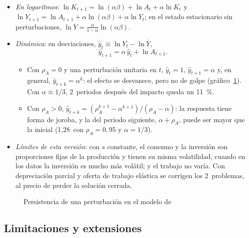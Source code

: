 \documentclass[11pt]{article}
\begin{document}
\begin{itemize}
\item \emph{En logaritmos}: $\ln K_{t+1}=\ln(\alpha\beta)+\ln A_t+\alpha\ln K_t$ y $\ln Y_{t+1}=\ln A_{t+1}+\alpha\ln(\alpha\beta)+\alpha\ln Y_t$; en el estado estacionario sin perturbaciones, $\ln\overline Y=\frac{\alpha}{1-\alpha}\ln(\alpha\beta)$.
\item \emph{Dinámica}: en desviaciones, $\hat y_t\equiv\ln Y_t-\ln\overline Y$,
  \begin{equation*}
  \hat y_{t+1}=\alpha\,\hat y_t+\ln A_{t+1}.
  \end{equation*}
  \begin{itemize}
  \item Con $\rho_A=0$ y una perturbación unitaria en $t$, $\hat y_t=1$, $\hat y_{t+1}=\alpha$ y, en general, $\hat y_{t+k}=\alpha^k$: el efecto se desvanece, pero no de golpe (gráfico~\ref{fig:persistencia-mccallum}). Con $\alpha\approx1/3$, 2~periodos después del impacto queda un 11~\%.
  \item Con $\rho_A>0$, $\hat y_{t+k}=(\rho_A^{k+1}-\alpha^{k+1})/(\rho_A-\alpha)$: la respuesta tiene forma de joroba, y la del periodo siguiente, $\alpha+\rho_A$, puede ser mayor que la inicial (1,28~con $\rho_A=0{,}95$ y $\alpha=1/3$).
  \end{itemize}
\item \emph{Límites de esta versión}: con $s$ constante, el consumo y la inversión son proporciones fijas de la producción y tienen su misma volatilidad, cuando en los datos la inversión es mucho más volátil; y el trabajo no varía. Con depreciación parcial y oferta de trabajo elástica se corrigen los 2~problemas, al precio de perder la solución cerrada.
\end{itemize}

\begin{figure}[H]
\centering
\caption{Persistencia de una perturbación en el modelo de }\label{fig:persistencia-mccallum}
\end{figure}

\subsection{Limitaciones y extensiones}
\end{document}
